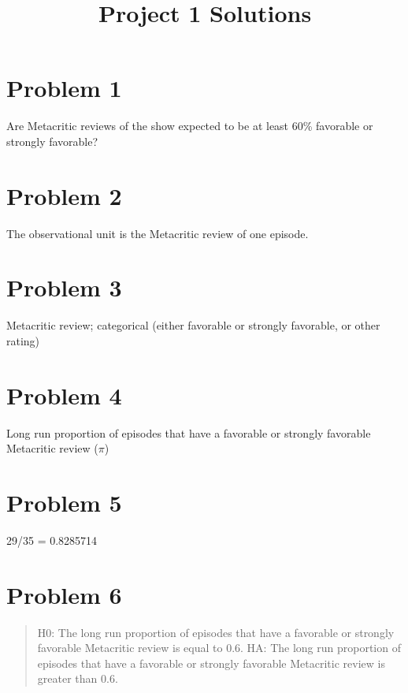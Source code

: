 \documentclass[
  letterpaper,
  DIV=11,
  numbers=noendperiod]{scrartcl}
\title{Project 1 Solutions}
\author{}
\date{}
\begin{document}
\maketitle


\section{Problem 1}\label{problem-1}

Are Metacritic reviews of the show expected to be at least 60\%
favorable or strongly favorable?

\section{Problem 2}\label{problem-2}

The observational unit is the Metacritic review of one episode.

\section{Problem 3}\label{problem-3}

Metacritic review; categorical (either favorable or strongly favorable,
or other rating)

\section{Problem 4}\label{problem-4}

Long run proportion of episodes that have a favorable or strongly
favorable Metacritic review (\(\pi\))

\section{Problem 5}\label{problem-5}

29/35 = 0.8285714

\section{Problem 6}\label{problem-6}

\begin{quote}
H0: The long run proportion of episodes that have a favorable or
strongly favorable Metacritic review is equal to 0.6. HA: The long run
proportion of episodes that have a favorable or strongly favorable
Metacritic review is greater than 0.6.
\end{quote}
\end{document}
